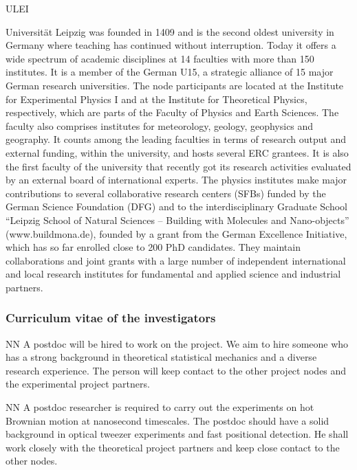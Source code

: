 \begin{sitedescription}{ULEI} \label{desc:ULEI}

 Universität Leipzig was founded in 1409 and is the second oldest university in Germany where teaching has continued without interruption. 
  Today it offers a wide spectrum of academic disciplines at 14 faculties with more than 150 institutes. 
  It is a member of the German U15, a strategic alliance of 15 major German research universities. 
  The node participants are located at the Institute for Experimental Physics I and at the Institute for Theoretical Physics, respectively, which are parts of the Faculty of Physics and Earth Sciences. 
  The faculty also comprises institutes for meteorology, geology, geophysics and geography. 
  It counts among the leading faculties in terms of research output and external funding, within the university, and hosts several ERC grantees. 
  It is also the first faculty of the university that recently got its research activities evaluated by an external board of international experts. 
  The physics institutes make major contributions to several collaborative research centers (SFBs) funded by the German Science Foundation (DFG) and to the interdisciplinary Graduate School ``Leipzig School of Natural Sciences -- Building with Molecules and Nano-objects'' (www.buildmona.de), founded by a grant from the German Excellence Initiative, which has so far enrolled close to 200 PhD candidates. 
  They maintain collaborations and joint grants with a large number of independent international and local research institutes for fundamental and applied science and industrial partners. 

\subsubsection*{Curriculum vitae of the investigators}




\begin{participant}[type=res,PM=48,salary=5500]{NN}
A postdoc will be hired to work on the project. We aim to hire someone who has a strong
background in theoretical statistical mechanics and a diverse research experience. The person will keep contact to the other project nodes and the experimental project partners.
\end{participant}

\begin{participant}[type=res,PM=36,salary=5500]{NN}
A postdoc researcher is required to carry out the experiments on hot Brownian motion at nanosecond timescales. The postdoc should have a solid background in optical tweezer experiments and fast positional detection. He shall work closely with the theoretical project partners and keep close contact to the other nodes.
\end{participant}


\end{sitedescription}
